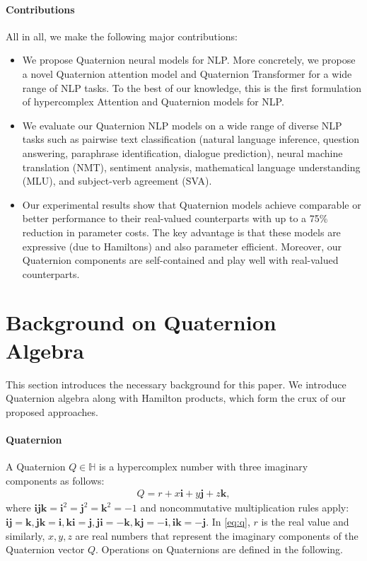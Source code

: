 \documentclass[11pt,a4paper]{article}
\def \bi {\mathbf{i}}
\def \bj {\mathbf{j}}
\def \bk {\mathbf{k}}
\begin{document}
\paragraph{Contributions} All in all, we make the following major contributions:
\begin{itemize}
    \item We propose Quaternion neural models for NLP. More concretely, we propose a novel Quaternion attention model and Quaternion Transformer for a wide range of NLP tasks. To the best of our knowledge, this is the first formulation of hypercomplex Attention and Quaternion models for NLP.
    \item We evaluate our Quaternion NLP models on a wide range of diverse NLP tasks such as pairwise text classification (natural language inference, question answering, paraphrase identification, dialogue prediction), neural machine translation (NMT), sentiment analysis, mathematical language understanding (MLU), and subject-verb agreement (SVA).
    \item Our experimental results show that Quaternion models achieve comparable or better performance to their real-valued counterparts with up to a 75\% reduction in parameter costs. The key advantage is that these models are expressive (due to Hamiltons) and also parameter efficient.
    Moreover, our Quaternion components are self-contained and play well with real-valued counterparts.
\end{itemize}

\section{Background on Quaternion Algebra}
This section introduces the necessary background for this paper. We introduce Quaternion algebra along with Hamilton products, which form the crux of our proposed approaches.
\paragraph{Quaternion} A Quaternion $Q \in \mathbb{H}$ is a hypercomplex number with three imaginary components as follows:
\begin{align}
\label{eq:q}
Q = r + x\bi + y\bj + z\bk,
\end{align}
where $\textbf{ijk}= \bi^2=\bj^2=\bk^2=-1$ and noncommutative multiplication rules apply: $\mathbf{ij} = \bk, \mathbf{jk} = \bi, \mathbf{ki} = \bj, \mathbf{ji} = -\bk, \mathbf{kj} = -\bi, \mathbf{ik} = -\bj$. In \eqref{eq:q}, $r$ is the real value and similarly, $x,y,z$ are real numbers that represent the imaginary components of the Quaternion vector $Q$. Operations on Quaternions are defined in the following.
\end{document}
